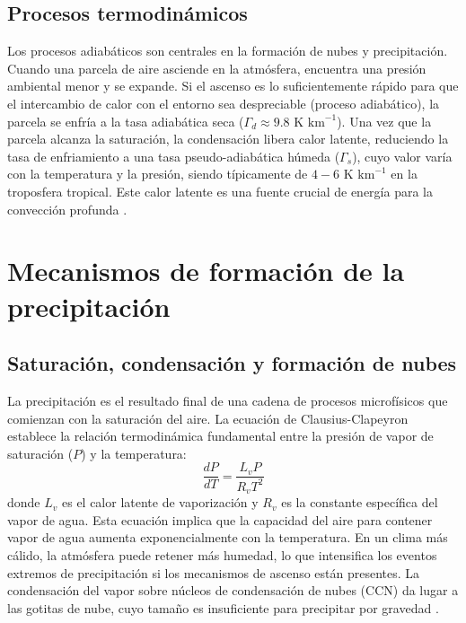 \subsection{Procesos termodinámicos}
Los procesos adiabáticos son centrales en la formación de nubes y precipitación. Cuando una parcela de aire asciende en la atmósfera, encuentra una presión ambiental menor y se expande. Si el ascenso es lo suficientemente rápido para que el intercambio de calor con el entorno sea despreciable (proceso adiabático), la parcela se enfría a la tasa adiabática seca (\(\Gamma_d \approx 9.8 \text{ K km}^{-1}\)). Una vez que la parcela alcanza la saturación, la condensación libera calor latente, reduciendo la tasa de enfriamiento a una tasa pseudo-adiabática húmeda (\(\Gamma_s\)), cuyo valor varía con la temperatura y la presión, siendo típicamente de \(4-6 \text{ K km}^{-1}\) en la troposfera tropical. Este calor latente es una fuente crucial de energía para la convección profunda \citep{dry_adiabatic_lapse_rate, landau1987fluid, glickman2000glossary}.

\section{Mecanismos de formación de la precipitación}

\subsection{Saturación, condensación y formación de nubes}
La precipitación es el resultado final de una cadena de procesos microfísicos que comienzan con la saturación del aire. La ecuación de Clausius-Clapeyron establece la relación termodinámica fundamental entre la presión de vapor de saturación (\(P\)) y la temperatura:
\begin{equation}
    \frac{dP}{dT} = \frac{L_v P}{R_v T^2}
\end{equation}
donde \(L_v\) es el calor latente de vaporización y \(R_v\) es la constante específica del vapor de agua. Esta ecuación implica que la capacidad del aire para contener vapor de agua aumenta exponencialmente con la temperatura. En un clima más cálido, la atmósfera puede retener más humedad, lo que intensifica los eventos extremos de precipitación si los mecanismos de ascenso están presentes. La condensación del vapor sobre núcleos de condensación de nubes (CCN) da lugar a las gotitas de nube, cuyo tamaño es insuficiente para precipitar por gravedad \citep{feynman1963thermodynamics, pippard1964elements}.

